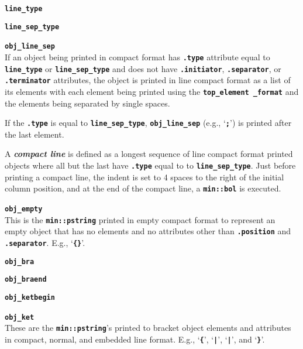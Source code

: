 \documentclass[12pt]{article}
\makeatletter
\newcommand{\TT}[1]{{\tt \bfseries #1}}
\newcommand{\key}[1]{{\bf \em #1}\index{#1}}
\newcommand{\ttmkey}[2]{\TT{#1}\index{#1@{\tt #1}!#2}}
\newcommand{\EOL}{\penalty \exhyphenpenalty}
\newenvironment{itemlist}[1][1.2in]%
	{\begin{list}{}{\setlength{\labelwidth}{#1}%
		        \setlength{\leftmargin}{\labelwidth}%
		        \addtolength{\leftmargin}{+0.2in}%
		        \renewcommand{\makelabel}[1]{##1\hfill}}}%
	{\end{list}}
\makeatother
\begin{document}
\begin{itemlist}[0.2in]
\item[\ttmkey{line\_type}{in {\tt min::obj\_format}}]
\item[\ttmkey{line\_sep\_type}{in {\tt min::obj\_format}}]\vspace{-2ex}
\item[\ttmkey{obj\_line\_sep}{in {\tt min::obj\_format}}]\vspace{-2ex}~\\
If an object being printed in compact format has \TT{.type} attribute
equal to \TT{line\_\EOL type} or \TT{line\_\EOL sep\_\EOL type}
and does not have
\TT{.initiator}, \TT{.separator}, or \TT{.terminator} attributes,
the object is printed in line compact format
as a list of its elements with each element
being printed using the \TT{top\_\EOL element \_\EOL format}
and the elements being separated by single spaces.

If the \TT{.type} is equal to \TT{line\_\EOL sep\_\EOL type},
\TT{obj\_\EOL line\_\EOL sep} (e.g., `\TT{;}')
is printed after the last element.

A \key{compact line} is defined as a longest sequence of line compact format
printed objects where all but the last have \TT{.type} equal to
to \TT{line\_\EOL sep\_\EOL type}.
Just before printing a compact line, the indent
is set to 4 spaces to the right
of the initial column position, and at the end of the compact line, a
\TT{min::bol} is executed.

\item[\ttmkey{obj\_empty}{in {\tt min::obj\_format}}]~\\
This is the \TT{min::pstring} printed in empty compact format
to represent an empty object that has no elements and no attributes
other than \TT{.position} and \TT{.separator}.  E.g., `\TT{\{\}}'.

\item[\ttmkey{obj\_bra}{in {\tt min::obj\_format}}]
\item[\ttmkey{obj\_braend}{in {\tt min::obj\_format}}]\vspace{-2ex}
\item[\ttmkey{obj\_ketbegin}{in {\tt min::obj\_format}}]\vspace{-2ex}
\item[\ttmkey{obj\_ket}{in {\tt min::obj\_format}}]\vspace{-2ex}~\\
These are the \TT{min::pstring}'s printed to bracket
object elements and attributes in compact, normal, and embedded line format.
E.g., `\TT{\{}', `\TT{|}', `\TT{|}', and `\TT{\}}'.


\end{itemlist}
\end{document}
